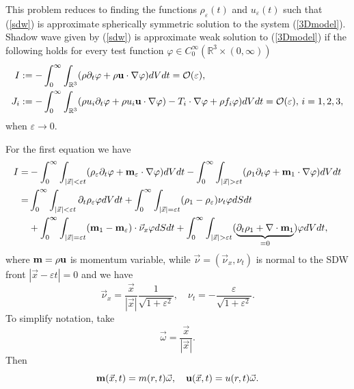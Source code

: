 \documentclass[reqno]{article}%
\theoremstyle{plain}
\theoremstyle{definition}
\theoremstyle{remark}
\numberwithin{equation}{section}
\begin{document}
 This problem reduces to finding the functions $\rho_\varepsilon(t)$ and $u_\varepsilon(t)$ such that (\ref{sdw}) is approximate spherically symmetric solution to the system (\ref{3Dmodel}). Shadow wave given by (\ref{sdw}) is approximate weak solution to (\ref{3Dmodel}) if the following holds for every test function $\varphi\in C_0^\infty(\mathbb{R}^3\times(0,\infty))$
\begin{equation*}
\begin{split}
I&:=-\int_{0}^\infty \int_{\mathbb{R}^3} (\rho \partial_t \varphi+\rho{\bf u}\cdot \nabla\varphi)dVdt=\mathcal{O}(\varepsilon),\\
J_i&:=-\int_{0}^\infty\int_{\mathbb{R}^3}(\rho u_i\partial_t\varphi+\rho u_i{\bf u}\cdot\nabla \varphi)-T_i\cdot \nabla \varphi+\rho f_i\varphi)dVdt=\mathcal{O}(\varepsilon),\,i=1,2,3,
\end{split}
\end{equation*}
when $\varepsilon\to 0$. 

For the first equation we have
\[\begin{split}
I=&-\int_0^\infty \int_{|\vec{x}|<\varepsilon t} (\rho_\varepsilon\partial_t \varphi+{\bf m}_\varepsilon\cdot \nabla \varphi)dVdt
-\int_0^\infty \int_{|\vec{x}|>\varepsilon t} (\rho_1\partial_t \varphi+{\bf m}_1\cdot \nabla\varphi)dVdt\\
=&\int_0^\infty\int_{|\vec{x}|<\varepsilon t} \partial_t \rho_\varepsilon\varphi dVdt+\int_0^\infty \int_{|\vec{x}|=\varepsilon t}(\rho_1-\rho_\varepsilon)\nu_t \varphi dSdt\\
& + \int_0^\infty \int_{|\vec{x}|=\varepsilon t}({\bf m}_1-{\bf m}_\varepsilon)\cdot\vec{\nu}_x \varphi dSdt+\int_0^\infty \int_{|\vec{x}|>\varepsilon t} (\underbrace{\partial_t\rho_1 +\nabla \cdot {\bf m}_1 }_{=0})\varphi dVdt,
\end{split}\]
where ${\bf m}=\rho {\bf u}$ is momentum variable, while $\vec{\nu}=(\vec{\nu}_x, \nu_t)$ is normal to the SDW front $|\vec{x}-\varepsilon t|=0$ and we have
\[\vec{\nu}_x=\frac{\vec{x}}{|\vec{x}|}\frac{1}{\sqrt{1+\varepsilon^2}},\quad \nu_t=-\frac{\varepsilon}{\sqrt{1+\varepsilon^2}}.\]
To simplify notation, take 
\[\vec{\omega}=\frac{\vec{x}}{|\vec{x}|}.\]
Then
\[{\bf m}(\vec{x},t)=m(r,t)\vec{\omega}, \quad {\bf u}(\vec{x},t)=u(r,t)\vec{\omega}.\]
\end{document}
